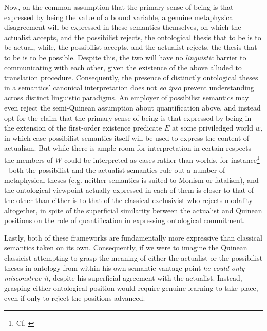\documentclass[]{article}
\begin{document}
Now, on the common assumption that the primary sense of being is that expressed by being the value of a bound variable, 
a genuine metaphysical disagreement will be expressed in these semantics themselves, 
on which the actualist accepts, 
and the possibilist rejects, 
the ontological thesis that to be is to be actual, 
while, the possibilist accepts, 
and the actualist rejects, 
the thesis that to be is to be possible. 
Despite this, the two will have no \emph{linguistic} barrier to communicating with each other, 
given the existence of the above alluded to translation procedure. 
Consequently, the presence of distinctly ontological theses in a semantics' canonical interpretation does not 
\emph{eo ipso} prevent understanding across distinct linguistic paradigms.  
An employer of possibilist semantics may even reject the semi-Quinean assumption about quantification above, 
and instead opt for the claim 
that the primary sense of being is that expressed by being in the extension of the first-order existence predicate $E$ at some priviledged world $w$, 
in which case possibilist semantics itself will be used to express the content of actualism. 
But while there is ample room for interpretation in certain respects - 
the members of $W$ could be interpreted as cases rather than worlds, for instance\footnote{Cf. \autocite{CIFOL1,CIFOL2}} - 
both the possibilist and the actualist semantics rule out a number of metaphysical theses 
(e.g. neither semantics is suited to Monism or fatalism), 
and the ontological viewpoint actually expressed in each of them is closer to that of the other than either is to that of the classical exclusivist who rejects modality altogether, 
in spite of the superficial similarity between the actualist and Quinean positions on the role of quantification in expressing ontological commitment. 

Lastly, both of these frameworks are fundamentally more expressive than classical semantics taken on its own.
Consequently, if we were to imagine the Quinean classicist attempting to grasp the meaning of either the actualist or the possibilist theses in ontology 
from within his own semantic vantage point
\emph{he could only misconstrue it}, 
despite his superficial agreement with the actualist. 
Instead, grasping either ontological position would require genuine learning to take place, 
even if only to reject the positions advanced. 
\end{document}
